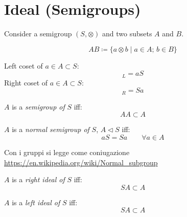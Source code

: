\documentclass[a4paper,12pt]{scrartcl}    %
\newcommand{\OpA}{\otimes}
\begin{document}
	\section{Ideal (Semigroups)}
	Consider a semigroup $(S, \OpA)$ and two subsets $A$ and $B$.
	\begin{notationfix}
		\begin{displaymath}
			A B \coloneqq \{ a \OpA b \; \vert \; a \in A ;\, b \in B \}
		\end{displaymath}
	\end{notationfix}
	\begin{notationfix}
		Left coset of $a \in A\subset S$:
		\begin{displaymath}
			[a]_L = a S
		\end{displaymath}
		Right coset of $a \in A\subset S$:
		\begin{displaymath}
			[a]_R =  S a
		\end{displaymath}
	\end{notationfix}
	
	\begin{definition}[SubSemigroup]
		$A$ is a \emph{semigroup of} $S$ iff:
		\begin{displaymath}
			A A \subset A 
		\end{displaymath}
	\end{definition}
	
		\begin{definition}
		$A$ is a \emph{normal semigroup of} $S$, $A \triangleleft S$ iff:
		\begin{displaymath}
			a S = S a \qquad \forall a \in A
		\end{displaymath}
	\end{definition}
	\begin{Warning}
		Con i gruppi si legge come coniugazione \url{https://en.wikipedia.org/wiki/Normal_subgroup}
	\end{Warning}
	

	\begin{definition}
		$A$ is a \emph{right ideal of} $S$ iff:
		\begin{displaymath}
			S A \subset A 
		\end{displaymath}
	\end{definition}
	
	\begin{definition}
		$A$ is a \emph{left ideal of} $S$ iff:
		\begin{displaymath}
			S A \subset A 
		\end{displaymath}
	\end{definition}
	
\end{document}
